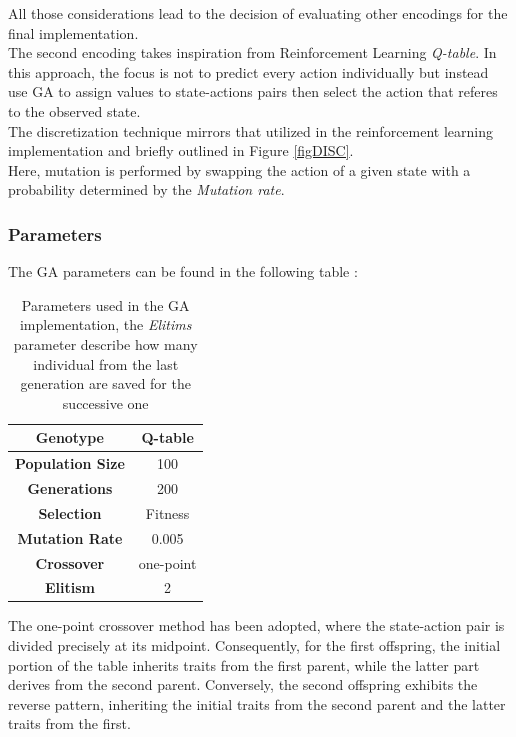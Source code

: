 All those considerations lead to the decision of evaluating other encodings for the final implementation.\\

The second encoding takes inspiration from Reinforcement Learning \textit{Q-table}.
In this approach, the focus is not to predict every action individually  but instead use GA to assign values to state-actions pairs then select the action that referes to the observed state.\\
The discretization technique mirrors that utilized in the reinforcement learning implementation and briefly outlined in Figure \ref{figDISC}.\\
Here, mutation is performed by swapping the action of a given state with a probability determined by the \textit{Mutation rate}.


\subsubsection{Parameters}
The GA parameters can be found in the following table :
\begin{table}[htb]%
	\centering
	\begin{tabular}{|S|S|} 		%
		
		\hline
		{\textbf{Genotype}} &  {Q-table} \\
		\hline
		{\textbf{Population Size}} & {100} \\
		\hline
		{\textbf{Generations}} & {200} \\
		\hline
		{\textbf{Selection}}  & {Fitness} \\
		\hline
		{\textbf{Mutation Rate}} & {0.005} \\
		\hline
		{\textbf{Crossover}}& {one-point} \\
		\hline
		{\textbf{Elitism}}&  {2}  \\
		\hline

	\end{tabular}
	\caption{Parameters used in the GA implementation, the \textit{Elitims} parameter describe how many individual from the last generation are saved for the successive one}
	\label{tab:GA_parameters}
\end{table}

The one-point crossover method has been adopted, where the state-action pair is divided precisely at its midpoint. Consequently, for the first offspring, the initial portion of the table inherits traits from the first parent, while the latter part derives from the second parent. Conversely, the second offspring exhibits the reverse pattern, inheriting the initial traits from the second parent and the latter traits from the first.

